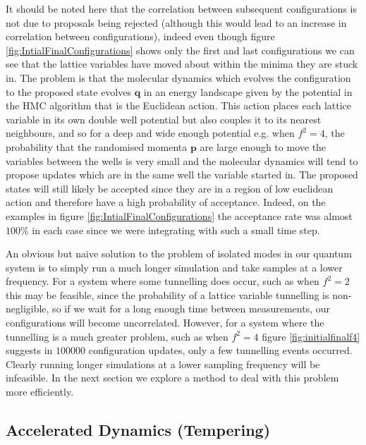 \documentclass[12pt]{article}
\begin{document}
        It should be noted here that the correlation between subsequent configurations is not due to proposals being rejected (although this would lead to an increase in correlation between configurations), indeed even though figure \ref{fig:IntialFinalConfigurations} shows only the first and last configurations we can see that the lattice variables have moved about within the minima they are stuck in. The problem is that the molecular dynamics which evolves the configuration to the proposed state evolves $\bm{q}$ in an energy landscape given by the potential in the HMC algorithm that is the Euclidean action. This action places each lattice variable in its own double well potential but also couples it to its nearest neighbours, and so for a deep and wide enough potential e.g. when $f^2=4$, the probability that the randomised momenta $\bm{p}$ are large enough to move the variables between the wells is very small and the molecular dynamics will tend to propose updates which are in the same well the variable started in. The proposed states will still likely be accepted since they are in a region of low euclidean action and therefore have a high probability of acceptance. Indeed, on the examples in figure \ref{fig:IntialFinalConfigurations} the acceptance rate was almost $100\%$ in each case since we were integrating with such a small time step.

        An obvious but naive solution to the problem of isolated modes in our quantum system is to simply run a much longer simulation and take samples at a lower frequency. For a system where some tunnelling does occur, such as when $f^2=2$ this may be feasible, since the probability of a lattice variable tunnelling is non-negligible, so if we wait for a long enough time between measurements, our configurations will become uncorrelated. However, for a system where the tunnelling is a much greater problem, such as when $f^2=4$ figure \ref{fig:initialfinalf4} suggests in $100000$ configuration updates, only a few tunnelling events occurred. Clearly running longer simulations at a lower sampling frequency will be infeasible. In the next section we explore a method to deal with this problem more efficiently.



    \label{sec:Tempering}
    \subsection{Accelerated Dynamics (Tempering)}
\end{document}
